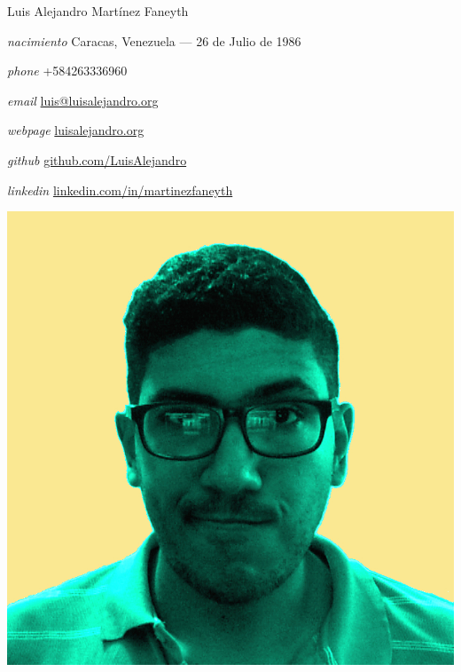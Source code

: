 \documentclass[10pt,letterpaper]{article}
\begin{document}
\begin{cv}{Luis Alejandro Mart\'inez Faneyth}
\vspace{1em}

\begin{minipage}{.7\linewidth}
\begin{cvlist}{}
\item[\textit{\large{nacimiento}}]{Caracas, Venezuela --- 26 de Julio de 1986}
\item[\textit{\large{phone}}]{+584263336960}
\item[\textit{\large{email}}]{\href{mailto:luis@luisalejandro.org}{luis@luisalejandro.org}}
\item[\textit{\large{webpage}}]{\href{http://luisalejandro.org}{luisalejandro.org}}
\item[\textit{\large{github}}]{\href{http://github.com/LuisAlejandro}{github.com/LuisAlejandro}}
\item[\textit{\large{linkedin}}]{\href{https://www.linkedin.com/in/martinezfaneyth}{linkedin.com/in/martinezfaneyth}}
\end{cvlist}
\end{minipage}
\begin{minipage}{.3\linewidth}
\includegraphics[scale=0.15]{curriculumvitae.jpg}
\end{minipage}
\vspace{1em}


\end{cv}
\end{document}

